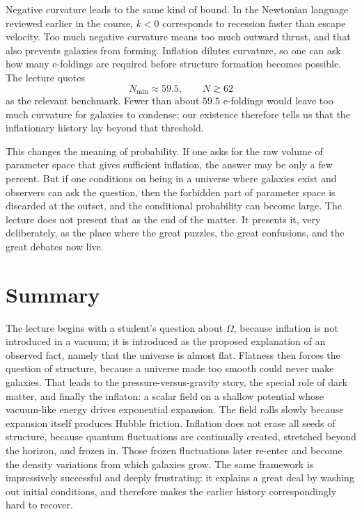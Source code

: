 Negative curvature leads to the same kind of bound. In the Newtonian language reviewed earlier in the course, \(k<0\) corresponds to recession faster than escape velocity. Too much negative curvature means too much outward thrust, and that also prevents galaxies from forming. Inflation dilutes curvature, so one can ask how many e-foldings are required before structure formation becomes possible. The lecture quotes
\begin{equation}
N_{\min}\approx 59.5,
\qquad
N\gtrsim 62
\end{equation}
as the relevant benchmark. Fewer than about \(59.5\) e-foldings would leave too much curvature for galaxies to condense; our existence therefore tells us that the inflationary history lay beyond that threshold.

This changes the meaning of probability. If one asks for the raw volume of parameter space that gives sufficient inflation, the answer may be only a few percent. But if one conditions on being in a universe where galaxies exist and observers can ask the question, then the forbidden part of parameter space is discarded at the outset, and the conditional probability can become large. The lecture does not present that as the end of the matter. It presents it, very deliberately, as the place where the great puzzles, the great confusions, and the great debates now live.

\section{Summary}

The lecture begins with a student's question about \(\Omega\), because inflation is not introduced in a vacuum; it is introduced as the proposed explanation of an observed fact, namely that the universe is almost flat. Flatness then forces the question of structure, because a universe made too smooth could never make galaxies. That leads to the pressure-versus-gravity story, the special role of dark matter, and finally the inflaton: a scalar field on a shallow potential whose vacuum-like energy drives exponential expansion. The field rolls slowly because expansion itself produces Hubble friction. Inflation does not erase all seeds of structure, because quantum fluctuations are continually created, stretched beyond the horizon, and frozen in. Those frozen fluctuations later re-enter and become the density variations from which galaxies grow. The same framework is impressively successful and deeply frustrating: it explains a great deal by washing out initial conditions, and therefore makes the earlier history correspondingly hard to recover.